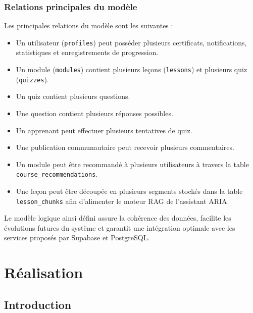 \documentclass[12pt, a4paper]{report}
\begin{document}
\subsection{Relations principales du modèle}

Les principales relations du modèle sont les suivantes :

\begin{itemize}

\item Un utilisateur (\texttt{profiles}) peut posséder plusieurs certificats,
notifications, statistiques et enregistrements de progression.

\item Un module (\texttt{modules}) contient plusieurs leçons
(\texttt{lessons}) et plusieurs quiz (\texttt{quizzes}).

\item Un quiz contient plusieurs questions.

\item Une question contient plusieurs réponses possibles.

\item Un apprenant peut effectuer plusieurs tentatives de quiz.

\item Une publication communautaire peut recevoir plusieurs commentaires.

\item Un module peut être recommandé à plusieurs utilisateurs à travers la table
\texttt{course\_recommendations}.

\item Une leçon peut être découpée en plusieurs segments stockés dans la table
\texttt{lesson\_chunks} afin d'alimenter le moteur RAG de l'assistant ARIA.

\end{itemize}

Le modèle logique ainsi défini assure la cohérence des données, facilite les
évolutions futures du système et garantit une intégration optimale avec les
services proposés par Supabase et PostgreSQL.


\chapter{Réalisation}

\section{Introduction}
\end{document}
